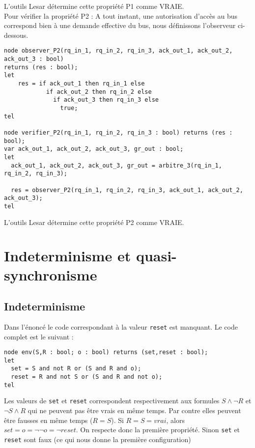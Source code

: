 \documentclass[a4paper]{article}
\begin{document}
L'outils Lesar détermine cette propriété P1 comme VRAIE.\\

Pour vérifier la propriété P2 : A tout instant, une autorisation d'accès au bus correspond bien à une demande effective du bus, nous définissons l'observeur ci-dessous.
\begin{verbatim}
node observer_P2(rq_in_1, rq_in_2, rq_in_3, ack_out_1, ack_out_2, ack_out_3 : bool)
returns (res : bool);
let
    res = if ack_out_1 then rq_in_1 else
            if ack_out_2 then rq_in_2 else
              if ack_out_3 then rq_in_3 else
                true;
tel

node verifier_P2(rq_in_1, rq_in_2, rq_in_3 : bool) returns (res : bool);
var ack_out_1, ack_out_2, ack_out_3, gr_out : bool;
let
  ack_out_1, ack_out_2, ack_out_3, gr_out = arbitre_3(rq_in_1, rq_in_2, rq_in_3);

  res = observer_P2(rq_in_1, rq_in_2, rq_in_3, ack_out_1, ack_out_2, ack_out_3);
tel
\end{verbatim}

L'outils Lesar détermine cette propriété P2 comme VRAIE.

\section{Indeterminisme et quasi-synchronisme}

\subsection{Indeterminisme}

Dans l'énoncé le code correspondant à la valeur \texttt{reset} est
manquant. Le code complet est le suivant :

\begin{verbatim}
node env(S,R : bool; o : bool) returns (set,reset : bool);
let
  set = S and not R or (S and R and o);
  reset = R and not S or (S and R and not o);
tel
\end{verbatim}

Les valeurs de \texttt{set} et \texttt{reset} correspondent
respectivement aux formules $S \wedge \neg R$ et $\neg S \wedge R$ qui
ne peuvent pas être vrais en même temps. Par contre elles peuvent être
fausses en même temps ($R = S$). Si $R = S = vrai$, alors $set = o = \neg
\neg o = \neg reset$. On respecte donc la première
propriété. Sinon \texttt{set} et \texttt{reset} sont faux
(ce qui nous donne la première configuration)
\end{document}
